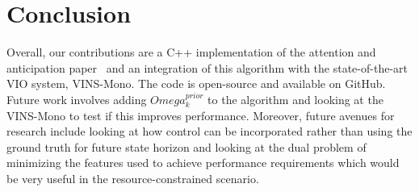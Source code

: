 
\section{Conclusion}\label{sec:conclusion}
Overall, our contributions are a C++ implementation of the attention and anticipation paper~\cite{Carlone2017} and an integration of this algorithm with the state-of-the-art VIO system, VINS-Mono. The code is open-source and available on GitHub. Future work involves adding $Omega_k^{prior}$ to the algorithm and looking at the VINS-Mono to test if this improves performance. Moreover, future avenues for research include looking at how control can be incorporated rather than using the ground truth for future state horizon and looking at the dual problem of minimizing the features used to achieve performance requirements which would be very useful in the resource-constrained scenario.